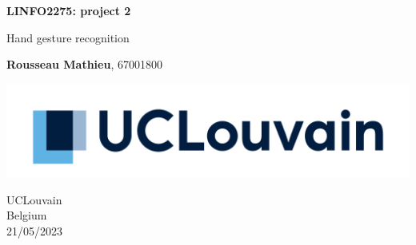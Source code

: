 \begin{titlepage}
	\begin{center}
	  \vspace*{1cm}
		  
	  \Huge
	  \textbf{LINFO2275: project 2}
		  
	  \vspace{0.5cm}
	  \LARGE
	  Hand gesture recognition
		  
	  \vspace{2.5cm}
	  
	  \Large
	  \textbf{Rousseau Mathieu}, 67001800
		  
	  \vfill
		  
	  \vspace{0.8cm}
		  
	  \includegraphics[width=\textwidth]{figures/logo_ucl.png}
  
	  \vspace{0.8cm}
		  
	  \Large
	  UCLouvain \\
	  Belgium \\
	  21/05/2023
	\end{center}
  \end{titlepage}